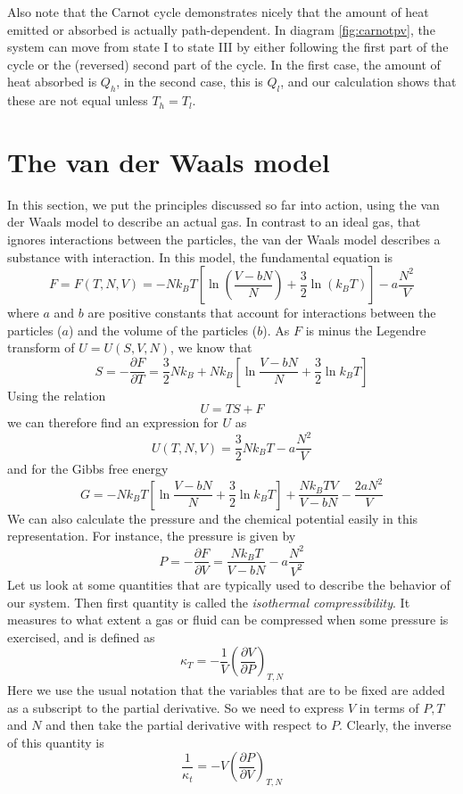 \documentclass[a4paper, draft]{article}
\theoremstyle{own}
\theoremstyle{remark}
\begin{document}
Also note that the Carnot cycle demonstrates nicely that the amount of heat emitted or absorbed is actually path-dependent. In diagram \ref{fig:carnotpv}, the system can move from state I to state III by either following the first part of the cycle or the (reversed) second part of the cycle. In the first case, the amount of heat absorbed is $Q_h$, in the second case, this is $Q_l$, and our calculation shows that these are not equal unless $T_h = T_l$.

\section{The van der Waals model}

In this section, we put the principles discussed so far into action, using the van der Waals model to describe an actual gas. In contrast to an ideal gas, that ignores interactions between the particles, the van der Waals model describes a substance with interaction. In this model, the fundamental equation is
$$
F = F(T,N,V) = - N k_B T [   \ln(\frac{V-bN}{N}) + \frac{3}{2} \ln (k_B T)] - a \frac{N^2}{V}
$$
where $a$ and $b$ are positive constants that account for interactions between the particles ($a$) and the volume of the particles ($b$). As $F$ is minus the Legendre transform of $U=U(S,V,N)$, we know that
$$
S = - \frac{\partial F}{\partial T} = \frac{3}{2} N k_B + 
N k_B [\ln \frac{V-bN}{N} + \frac{3}{2} \ln k_B T]
$$
Using the relation
$$
U = TS + F
$$
we can therefore find an expression for $U$ as
$$
U(T,N,V) = \frac{3}{2} N k_B T - a \frac{N^2}{V}
$$
and for the Gibbs free energy
$$
G = - N k_B T [ \ln\frac{V-bN}{N} + \frac{3}{2} \ln k_B T] + \frac{N k_B TV}{V-bN} 
-\frac{2aN^2}{V	}
$$
We can also calculate the pressure and the chemical potential easily in this representation. For instance, the pressure is given by 
$$
P = - \frac{\partial F}{\partial V} =  \frac{N k_B T}{V-bN}  - a \frac{N^2}{V^2}
$$
Let us look at some quantities that are typically used to describe the behavior of our system. Then first quantity is called the {\em isothermal compressibility}. It measures to what extent a gas or fluid can be compressed when some pressure is exercised, and is defined as
$$
\kappa_T = - \frac{1}{V}  (\frac{\partial V}{\partial P})_{T,N}
$$
Here we use the usual notation that the variables that are to be fixed are added as a subscript to the partial derivative. So we need to express $V$ in terms of $P,T$ and $N$ and then take the partial derivative with respect to $P$. Clearly, the inverse of this quantity is
$$
\frac{1}{\kappa_t} = - V  (\frac{\partial P}{\partial V})_{T,N}
$$
\end{document}
